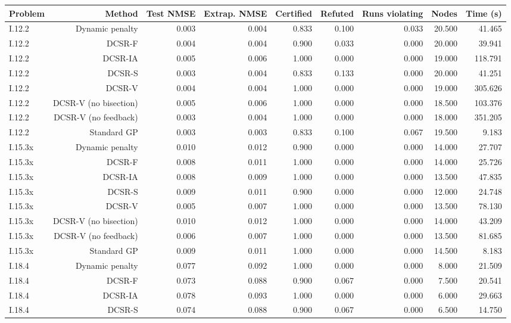 \begin{tabular}{lrrrrrrrr}
\toprule
Problem & Method & Test NMSE & Extrap. NMSE & Certified & Refuted & Runs violating & Nodes & Time (s) \\
\midrule
I.12.2 & Dynamic penalty & 0.003 & 0.004 & 0.833 & 0.100 & 0.033 & 20.500 & 41.465 \\
I.12.2 & DCSR-F & 0.004 & 0.004 & 0.900 & 0.033 & 0.000 & 20.000 & 39.941 \\
I.12.2 & DCSR-IA & 0.005 & 0.006 & 1.000 & 0.000 & 0.000 & 19.000 & 118.791 \\
I.12.2 & DCSR-S & 0.003 & 0.004 & 0.833 & 0.133 & 0.000 & 20.000 & 41.251 \\
I.12.2 & DCSR-V & 0.004 & 0.004 & 1.000 & 0.000 & 0.000 & 19.000 & 305.626 \\
I.12.2 & DCSR-V (no bisection) & 0.005 & 0.006 & 1.000 & 0.000 & 0.000 & 18.500 & 103.376 \\
I.12.2 & DCSR-V (no feedback) & 0.003 & 0.004 & 1.000 & 0.000 & 0.000 & 18.000 & 351.205 \\
I.12.2 & Standard GP & 0.003 & 0.003 & 0.833 & 0.100 & 0.067 & 19.500 & 9.183 \\
I.15.3x & Dynamic penalty & 0.010 & 0.012 & 0.900 & 0.000 & 0.000 & 14.000 & 27.707 \\
I.15.3x & DCSR-F & 0.008 & 0.011 & 1.000 & 0.000 & 0.000 & 14.000 & 25.726 \\
I.15.3x & DCSR-IA & 0.008 & 0.009 & 1.000 & 0.000 & 0.000 & 13.500 & 47.835 \\
I.15.3x & DCSR-S & 0.009 & 0.011 & 0.900 & 0.000 & 0.000 & 12.000 & 24.748 \\
I.15.3x & DCSR-V & 0.005 & 0.007 & 1.000 & 0.000 & 0.000 & 13.500 & 78.130 \\
I.15.3x & DCSR-V (no bisection) & 0.010 & 0.012 & 1.000 & 0.000 & 0.000 & 14.000 & 43.209 \\
I.15.3x & DCSR-V (no feedback) & 0.006 & 0.007 & 1.000 & 0.000 & 0.000 & 13.500 & 81.685 \\
I.15.3x & Standard GP & 0.009 & 0.011 & 1.000 & 0.000 & 0.000 & 14.500 & 8.183 \\
I.18.4 & Dynamic penalty & 0.077 & 0.092 & 1.000 & 0.000 & 0.000 & 8.000 & 21.509 \\
I.18.4 & DCSR-F & 0.073 & 0.088 & 0.900 & 0.067 & 0.000 & 7.500 & 20.541 \\
I.18.4 & DCSR-IA & 0.078 & 0.093 & 1.000 & 0.000 & 0.000 & 6.000 & 29.663 \\
I.18.4 & DCSR-S & 0.074 & 0.088 & 0.900 & 0.067 & 0.000 & 6.500 & 14.750 \\

\end{tabular}
